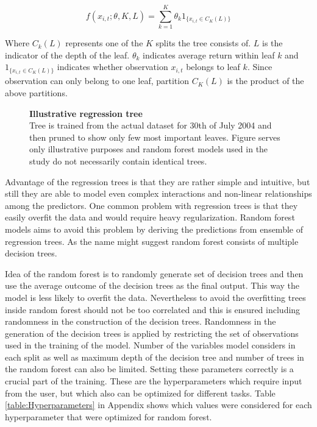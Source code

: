 \documentclass{article}
\begin{document}
\begin{equation}
f(x_{i, t}; \theta, K, L) = \sum_{k=1}^K \theta_k 1 _{\{x_{i, t} \in C_K(L)\}}
\end{equation}

Where $C_k(L)$ represents one of the $K$ splits the tree consists of. $L$ is the indicator of the depth of the leaf. $\theta_k$ indicates average return within leaf $k$ and $1 _{\{x_{i, t} \in C_K(L)\}}$ indicates whether observation $x_{i, t}$ belongs to leaf $k$. Since observation can only belong to one leaf, partition $C_K(L)$ is the product of the above partitions.

\begin{figure}[ht]
\centering
\caption[Illustrative regression tree]{\textbf{Illustrative regression tree}\\ Tree is trained from the actual dataset for 30th of July 2004 and then pruned to show only few most important leaves. Figure serves only illustrative purposes and random forest models used in the study do not necessarily contain identical trees. }

\label{plot:regre_tree}
\end{figure}

Advantage of the regression trees is that they are rather simple and intuitive, but still they are able to model even complex interactions and non-linear relationships among the predictors. One common problem with regression trees is that they easily overfit the data and would require heavy regularization. Random forest models aims to avoid this problem by deriving the predictions from ensemble of regression trees. As the name might suggest random forest consists of multiple decision trees. 

Idea of the random forest is to randomly generate set of decision trees and then use the average outcome of the decision trees as the final output. This way the model is less likely to overfit the data. Nevertheless to avoid the overfitting trees inside random forest should not be too correlated and this is ensured including randomness in the construction of the decision trees. Randomness in the generation of the decision trees is applied by restricting the set of observations used in the training of the model. Number of the variables model considers in each split as well as maximum depth of the decision tree and number of trees in the random forest can also be limited. Setting these parameters correctly is a crucial part of the training. These are the hyperparameters which require input from the user, but which also can be optimized for different tasks. Table \ref{table:Hyperparameters} in Appendix shows which values were considered for each hyperparameter that were optimized for random forest.
\end{document}
